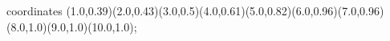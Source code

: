 					coordinates { (1.0,0.39)(2.0,0.43)(3.0,0.5)(4.0,0.61)(5.0,0.82)(6.0,0.96)(7.0,0.96)(8.0,1.0)(9.0,1.0)(10.0,1.0)};
